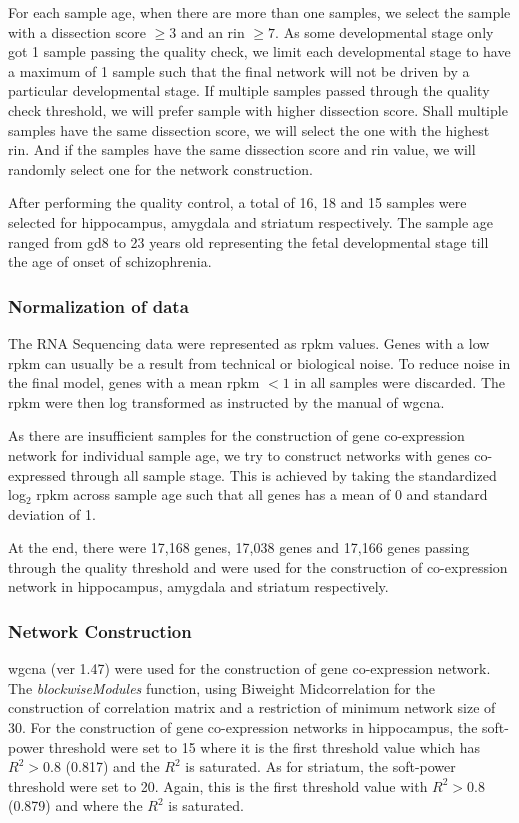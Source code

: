 \documentclass{book}
\begin{document}
	For each sample age, when there are more than one samples, we select the sample with a dissection score $\ge3$ and an \gls{rin} $\ge7$. 
	As some developmental stage only got 1 sample passing the quality check, we limit each developmental stage to have a maximum of 1 sample such that the final network will not be driven by a particular developmental stage. 
	If multiple samples passed through the quality check threshold, we will prefer sample with higher dissection score. 
	Shall multiple samples have the same dissection score, we will select the one with the highest \gls{rin}. 
	And if the samples have the same dissection score and \gls{rin} value, we will randomly select one for the network construction.
	
	After performing the quality control, a total of 16, 18 and 15 samples were selected for hippocampus, amygdala and striatum respectively.
	The sample age ranged from \gls{gd}8 to 23 years old representing the fetal developmental stage till the age of onset of schizophrenia.
	
	\subsubsection{Normalization of data}
	The RNA Sequencing data were represented as \gls{rpkm} values. 
	Genes with a low \gls{rpkm} can usually be a result from technical or biological noise\citep{Hart2013}.
	To reduce noise in the final model, genes with a mean \gls{rpkm} $< 1$ in all samples were discarded. 
	The \gls{rpkm} were then log transformed as instructed by the manual of \gls{wgcna}\citep{Langfelder2008}.
	
	As there are insufficient samples for the construction of gene co-expression network for individual sample age, we try to construct networks with genes co-expressed through all sample stage. 
	This is achieved by taking the standardized log$_2$ \gls{rpkm} across sample age such that all genes has a mean of 0 and standard deviation of 1.
	
	At the end, there were 17,168 genes, 17,038 genes and 17,166 genes passing through the quality threshold and were used for the construction of co-expression network in hippocampus, amygdala and striatum respectively. 
	 
	\subsubsection{Network Construction}
	\gls{wgcna} (ver 1.47) were used for the construction of gene co-expression network\citep{Langfelder2008}. 
	The \emph{blockwiseModules} function, using Biweight Midcorrelation for the construction of correlation matrix and a restriction of minimum network size of 30. 
	For the construction of gene co-expression networks in hippocampus, the soft-power threshold were set to 15 where it is the first threshold value which has $R^2 > 0.8$ (0.817) and the $R^2$ is saturated\citep{Zhang2005}.%
	As for striatum, the soft-power threshold were set to 20. 
	Again, this is the first threshold value with $R^2 >0.8$ (0.879) and where the $R^2$ is saturated.
	
\end{document}
